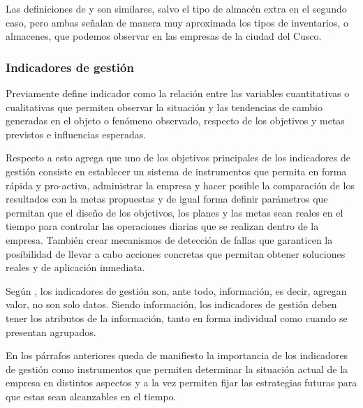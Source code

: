 Las definiciones de \cite{meza} y \citep{chapman} son similares, salvo el tipo de
almacén extra en el segundo caso, pero ambas señalan de manera muy aproximada los
tipos de inventarios, o almacenes, que podemos observar en las empresas de la ciudad
del Cusco.

\subsubsection{Indicadores de gestión}
Previamente \cite{beltran} define indicador como la relación entre las variables
cuantitativas o cualitativas que permiten observar la situación y las tendencias
de cambio generadas en el objeto o fenómeno observado, respecto de los objetivos
y metas previstos e influencias esperadas.

Respecto a esto \cite{silva} agrega que uno de los objetivos principales de los
indicadores de gestión consiste en establecer un sistema de instrumentos que
permita en forma rápida y pro-activa, administrar la empresa y hacer posible la
comparación de los resultados con la metas propuestas y de igual forma definir
parámetros que permitan que el diseño de los objetivos, los planes y las metas sean
reales en el tiempo para controlar las operaciones diarias que se realizan dentro
de la empresa. También crear mecanismos de detección de fallas que garanticen
la posibilidad de llevar a cabo acciones concretas que permitan obtener soluciones
reales y de aplicación inmediata.

Según \cite{beltran}, los indicadores de gestión son, ante todo, información, es
decir, agregan valor, no son solo datos. Siendo información, los indicadores de
gestión deben tener los atributos de la información, tanto en forma individual
como cuando se presentan agrupados.

En los párrafos anteriores queda de manifiesto la importancia de los indicadores
de gestión como instrumentos que permiten determinar la situación actual de la
empresa en distintos aspectos y a la vez permiten fijar las estrategias futuras
para que estas sean alcanzables en el tiempo.

